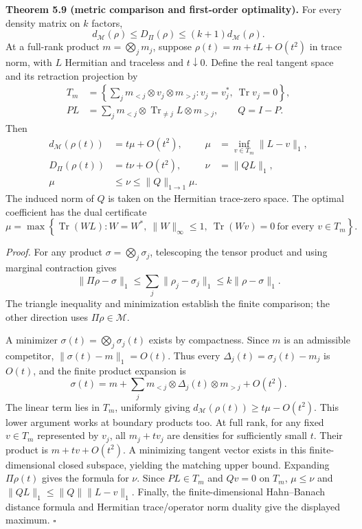 \documentclass[
  11pt,
]{article}
\begin{document}
\textbf{Theorem 5.9 (metric comparison and first-order optimality).} For every density
matrix on \(k\) factors,
\[
d_{\mathcal M}(\rho)\le D_\Pi(\rho)\le(k+1)d_{\mathcal M}(\rho).
\]
At a full-rank product \(m=\bigotimes_jm_j\), suppose
\(\rho(t)=m+tL+O(t^2)\) in trace norm, with \(L\) Hermitian and traceless and
\(t\downarrow0\). Define the real tangent space and its retraction projection by
\[
\begin{aligned}
T_m&=\left\{\sum_jm_{<j}\otimes v_j\otimes m_{>j}:
                 v_j=v_j^*,\ \operatorname{Tr}v_j=0\right\},\\
PL&=\sum_jm_{<j}\otimes\operatorname{Tr}_{\ne j}L\otimes m_{>j},
\qquad Q=I-P.
\end{aligned}
\]
Then
\[
\begin{aligned}
d_{\mathcal M}(\rho(t))&=t\mu+O(t^2),
&\mu&=\inf_{v\in T_m}\lVert L-v\rVert_1,\\
D_\Pi(\rho(t))&=t\nu+O(t^2),
&\nu&=\lVert QL\rVert_1,\\
\mu&\le\nu\le\lVert Q\rVert_{1\to1}\mu.
\end{aligned}
\]
The induced norm of \(Q\) is taken on the Hermitian trace-zero space. The optimal
coefficient has the dual certificate
\[
\mu=\max\left\{\operatorname{Tr}(WL): W=W^*,\ \lVert W\rVert_\infty\le1,
                  \ \operatorname{Tr}(Wv)=0\ \text{for every }v\in T_m\right\}.
\]

\emph{Proof.} For any product \(\sigma=\bigotimes_j\sigma_j\), telescoping the tensor
product and using marginal contraction gives
\[
\lVert \Pi\rho-\sigma\rVert_1\le\sum_j\lVert \rho_j-\sigma_j\rVert_1
                    \le k\lVert \rho-\sigma\rVert_1.
\]
The triangle inequality and minimization establish the finite comparison; the other
direction uses \(\Pi\rho\in\mathcal M\).

A minimizer \(\sigma(t)=\bigotimes_j\sigma_j(t)\) exists by compactness. Since
\(m\) is an admissible competitor, \(\lVert \sigma(t)-m\rVert_1=O(t)\). Thus every
\(\Delta_j(t)=\sigma_j(t)-m_j\) is \(O(t)\), and the finite product expansion is
\[
\sigma(t)=m+\sum_jm_{<j}\otimes\Delta_j(t)\otimes m_{>j}+O(t^2).
\]
The linear term lies in \(T_m\), uniformly giving
\(d_{\mathcal M}(\rho(t))\ge t\mu-O(t^2)\). This lower argument works at
boundary products too. At full rank, for any fixed \(v\in T_m\) represented by
\(v_j\), all \(m_j+tv_j\) are densities for sufficiently small \(t\). Their product
is \(m+tv+O(t^2)\). A minimizing tangent vector exists in this finite-dimensional
closed subspace, yielding the matching upper bound. Expanding \(\Pi\rho(t)\)
gives the formula for \(\nu\). Since \(PL\in T_m\) and \(Qv=0\) on \(T_m\),
\(\mu\le\nu\) and \(\lVert QL\rVert_1\le\lVert Q\rVert\lVert L-v\rVert_1\). Finally, the
finite-dimensional Hahn--Banach distance formula and Hermitian trace/operator
norm duality give the displayed maximum. \(\square\)
\end{document}
